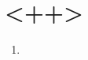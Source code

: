 \documentclass[letterpaper,10pt]{memoir}
\begin{document}
\titulo

\section*{<++>} %
\begin{enumerate}
	\item <++>
\end{enumerate}
\end{document}

